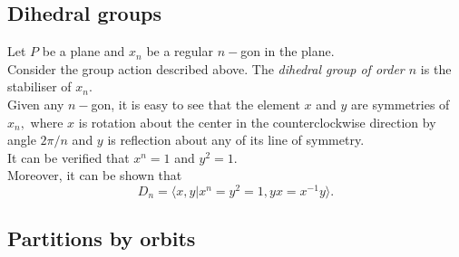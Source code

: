 \documentclass[12 pt, a4paper, toc=graduated, oneside]{article}
\theoremstyle{definition}
\begin{document}
\subsection{Dihedral groups}
Let $P$ be a plane and $x_n$ be a regular $n-$gon in the plane.\\
Consider the group action described above. The \emph{dihedral group of order $n$} is the stabiliser of $x_n.$\\
Given any $n-$gon, it is easy to see that the element $x$ and $y$ are symmetries of $x_n,$ where $x$ is rotation about the center in the counterclockwise direction by angle $2\pi/n$ and $y$ is reflection about any of its line of symmetry. \\
It can be verified that $x^{n} = 1$ and $y^2 = 1.$\\
Moreover, it can be shown that
\[D_n = \langle x, y | x^n = y^2 = 1, yx = x^{-1}y \rangle.\]

\subsection{Partitions by orbits}
\end{document}
